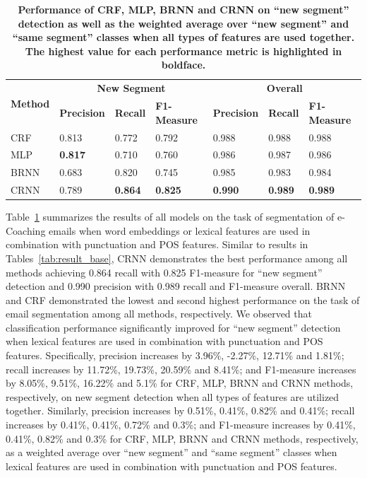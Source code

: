 \documentclass{amia}
\begin{document}
\begin{table}[ht]
\centering
\caption{\textbf{Performance of CRF, MLP, BRNN and CRNN on ``new segment'' detection as well as the weighted average over ``new segment'' and ``same segment'' classes when all types of features are used together. The highest value for each performance metric is highlighted in boldface.}}
\label{tab:result_weighted_avg}
 \begin{tabular}{|l|l|l|l|l|l|l|}
  \hline
   \multirow{2}{*}{\textbf{Method}} & \multicolumn{3}{|c|}{\textbf{New Segment}} & \multicolumn{3}{|c|}{\textbf{Overall}} \\\cline{2-7}
   & \textbf{Precision}  & \textbf{Recall} & \textbf{F1-Measure} & \textbf{Precision}  & \textbf{Recall} & \textbf{F1-Measure} \\ \hline    
 CRF & 0.813 & 0.772 & 0.792 & 0.988 & 0.988 & 0.988 \\ \hline
 MLP & \textbf{0.817} & 0.710 & 0.760 & 0.986 & 0.987 & 0.986 \\ \hline
 BRNN & 0.683 & 0.820 & 0.745 & 0.985 & 0.983 & 0.984 \\ \hline
 CRNN & 0.789 & \textbf{0.864} & \textbf{0.825} & \textbf{0.990} & \textbf{0.989} & \textbf{0.989} \\ \hline
  \end{tabular}
\end{table}       

Table~\ref{tab:result_weighted_avg} summarizes the results of all models on the task of segmentation of e-Coaching emails when word embeddings or lexical features are used in combination with punctuation and POS features. Similar to results in Tables~\ref{tab:result_base}, CRNN demonstrates the best performance among all methods achieving 0.864 recall with 0.825 F1-measure for ``new segment'' detection and 0.990 precision with 0.989 recall and F1-measure overall. BRNN and CRF demonstrated the lowest and second highest performance on the task of email segmentation among all methods, respectively. We observed that classification performance significantly improved for ``new segment'' detection when lexical features are used in combination with punctuation and POS features. Specifically, precision increases by 3.96\%, -2.27\%, 12.71\% and 1.81\%; recall increases by 11.72\%, 19.73\%, 20.59\% and 8.41\%; and F1-measure increases by 8.05\%, 9.51\%, 16.22\% and 5.1\% for CRF, MLP, BRNN and CRNN methods, respectively, on new segment detection when all types of features are utilized together. Similarly, precision increases by 0.51\%, 0.41\%, 0.82\% and 0.41\%; recall increases by 0.41\%, 0.41\%, 0.72\% and 0.3\%; and F1-measure increases by 0.41\%, 0.41\%, 0.82\% and 0.3\% for CRF, MLP, BRNN and CRNN methods, respectively, as a weighted average over ``new segment'' and ``same segment'' classes when lexical features are used in combination with punctuation and POS features.\\
\end{document}
